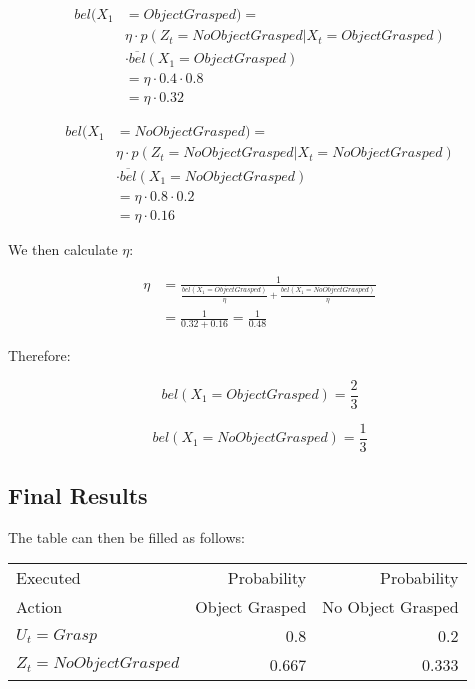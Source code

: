\documentclass{article}
\begin{document}
\begin{align*}
bel(X_1&=ObjectGrasped) = \\
					&\eta \cdot p(Z_t=NoObjectGrasped|X_t=ObjectGrasped)\\
					& \cdot  \overline{bel}(X_1=ObjectGrasped)\\
					& = \eta \cdot 0.4 \cdot 0.8\\
					& = \eta \cdot 0.32
\end{align*}

\begin{align*}
bel(X_1&=NoObjectGrasped) = \\
					& \eta \cdot p(Z_t=NoObjectGrasped|X_t=NoObjectGrasped)\\
					& \cdot  \overline{bel}(X_1=NoObjectGrasped)\\
					& = \eta \cdot 0.8 \cdot 0.2\\
					& = \eta \cdot 0.16
\end{align*}

We then calculate $\eta$:

\begin{align*}
\eta &= \frac{1}{\frac{bel(X_1=ObjectGrasped)}{\eta} + \frac{bel(X_1=NoObjectGrasped)}{\eta}}\\
	& = \frac{1}{0.32 + 0.16} = \frac{1}{0.48}
\end{align*}

Therefore:

\[
bel(X_1=ObjectGrasped) = \frac{2}{3}
\]


\[
bel(X_1=NoObjectGrasped) = \frac{1}{3}
\]


\subsection{Final Results}

The table can then be filled as follows:

\hspace{5pt}

\begin{tabular}{l | r  r}
Executed & Probability & Probability\\
Action & Object Grasped & No Object Grasped\\
\hline
$U_t = Grasp$ & 0.8 & 0.2 \\
$Z_t = NoObjectGrasped$ & 0.667 & 0.333 
\end{tabular}





%
%
\end{document}
